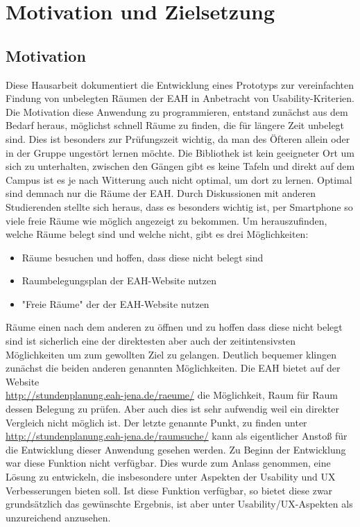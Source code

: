 \section{Motivation und Zielsetzung}
\subsection{Motivation}

Diese Hausarbeit dokumentiert die Entwicklung eines Prototyps zur
vereinfachten Findung von unbelegten Räumen der \ac{EAH} in Anbetracht
von Usability-Kriterien. Die Motivation diese
Anwendung zu programmieren, entstand zunächst aus dem Bedarf heraus,
möglichst schnell Räume zu finden, die für längere Zeit unbelegt sind.
Dies ist besonders zur Prüfungszeit wichtig, da man des Öfteren allein oder
in der Gruppe ungestört lernen möchte. Die Bibliothek ist kein
geeigneter Ort um sich zu unterhalten, zwischen den Gängen
gibt es keine Tafeln und direkt auf dem Campus ist es je nach Witterung
auch nicht optimal, um dort zu lernen. Optimal sind demnach nur die Räume
der EAH. Durch Diskussionen mit anderen Studierenden stellte sich heraus,
dass es besonders wichtig ist, per Smartphone so viele freie Räume
wie möglich angezeigt zu bekommen.
Um herauszufinden, welche Räume belegt sind und welche nicht,
gibt es drei Möglichkeiten:

\begin{itemize}
    \itemsep-0.4em
    \item Räume besuchen und hoffen, dass diese nicht belegt sind
    \item Raumbelegungsplan der EAH-Website nutzen
    \item "Freie Räume" der der EAH-Website nutzen
\end{itemize}

Räume einen nach dem anderen zu öffnen und zu hoffen dass diese
nicht belegt sind ist sicherlich eine der direktesten aber auch der zeitintensivsten
Möglichkeiten um zum gewollten Ziel zu gelangen. Deutlich bequemer klingen zunächst
die beiden anderen genannten Möglichkeiten. Die EAH bietet auf der Website\\
\url{http://stundenplanung.eah-jena.de/raeume/} die Möglichkeit, Raum für Raum
dessen Belegung zu prüfen. Aber auch dies ist sehr aufwendig weil ein direkter
Vergleich nicht möglich ist. Der letzte genannte Punkt, zu finden unter
\url{http://stundenplanung.eah-jena.de/raumsuche/} kann als eigentlicher
Anstoß für die Entwicklung dieser Anwendung gesehen werden.
Zu Beginn der Entwicklung war diese Funktion nicht verfügbar. Dies wurde zum Anlass genommen,
eine Lösung zu entwickeln, die insbesondere unter Aspekten der Usability und \ac{UX} Verbesserungen
bieten soll. Ist diese Funktion verfügbar, so bietet diese zwar grundsätzlich das gewünschte Ergebnis,
ist aber unter Usability/UX-Aspekten als unzureichend anzusehen.


